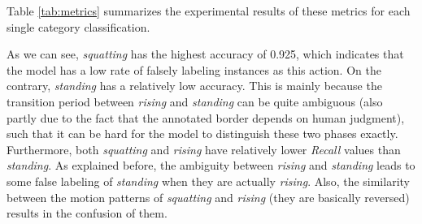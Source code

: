 Table \ref{tab:metrics} summarizes the experimental results of these metrics for each single category classification.
\begin{table}[b]
\centering
\caption{Performance metrics for assessing GMoE model recognizing multi-class human lifting actions.}
\end{table}
As we can see, \emph{squatting} has the highest accuracy of 0.925, which indicates that the model has a low rate of falsely labeling instances as this action. On the contrary, \emph{standing} has a relatively low accuracy. This is mainly because the transition period between \emph{rising} and \emph{standing} can be quite ambiguous (also partly due to the fact that the annotated border depends on human judgment), such that it can be hard for the model to distinguish these two phases exactly. Furthermore, both \emph{squatting} and \emph{rising} have relatively lower \emph{Recall} values than \emph{standing}. As explained before, the ambiguity between \emph{rising} and \emph{standing} leads to some false labeling of \emph{standing} when they are actually \emph{rising}. Also, the similarity between the motion patterns of \emph{squatting} and \emph{rising} (they are basically reversed) results in the confusion of them.

